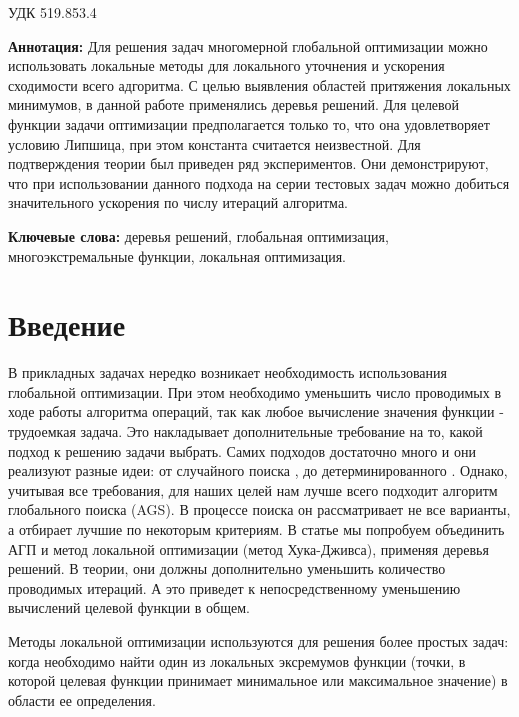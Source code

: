 \documentclass[12pt, a4paper, russian]{article}
\begin{document}
УДК 519.853.4

\vspace{\baselineskip}

\begin{small}
\textbf{Аннотация:} Для решения задач многомерной глобальной оптимизации можно использовать локальные методы для локального уточнения и ускорения сходимости всего адгоритма. С целью выявления областей притяжения локальных минимумов, в данной работе применялись деревья решений. Для целевой функции задачи оптимизации предполагается только то, что она удовлетворяет условию Липшица, при этом константа считается неизвестной. Для подтверждения теории был приведен ряд экспериментов. Они демонстрируют, что при использовании данного подхода на серии тестовых задач можно добиться значительного ускорения по числу итераций алгоритма.

\textbf{Ключевые слова:} деревья решений, глобальная оптимизация, многоэкстремальные функции, локальная оптимизация.
\end{small}


\section{Введение}

В прикладных задачах нередко возникает необходимость использования глобальной оптимизации. При этом необходимо уменьшить число проводимых в ходе работы алгоритма операций, так как любое вычисление значения функции - трудоемкая задача. Это накладывает дополнительные требование на то, какой подход к решению задачи выбрать. Самих подходов достаточно много и они реализуют разные идеи: от случайного поиска \cite{fio_bib1, fio_bib2, fio_bib3}, до детерминированного \cite{fio_bib4, fio_bib5, fio_bib6}. Однако, учитывая все требования, для наших целей нам лучше всего подходит алгоритм глобального поиска (AGS). В процессе поиска он рассматривает не все варианты, а отбирает лучшие по некоторым критериям. В статье мы попробуем объединить АГП и метод локальной оптимизации (метод Хука-Дживса), применяя деревья решений. В теории, они должны дополнительно уменьшить количество проводимых итераций. А это приведет к непосредственному уменьшению вычислений целевой функции в общем.

Методы локальной оптимизации используются для решения более простых задач: когда необходимо найти один из локальных эксремумов функции (точки, в которой целевая функции принимает минимальное или максимальное значение) в области ее определения.
\end{document}
